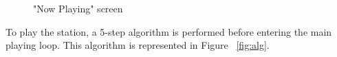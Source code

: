 \begin{figure}[htbp]
	\centering
	 \qquad
	 \qquad
	\caption{"Now Playing" screen}
	\label{fig:npslol}
\end{figure}


To play the station, a 5-step algorithm is performed before entering the main playing loop. This algorithm is represented in Figure ~\ref{fig:alg}.

